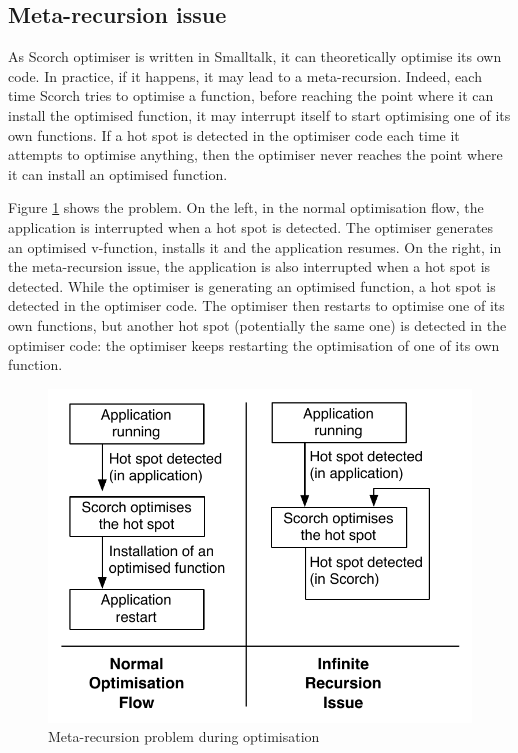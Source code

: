 \documentclass[a4paper,12pt,twoside]{../includes/ThesisStyle}
\begin{document}
\subsection{Meta-recursion issue}

As Scorch optimiser is written in Smalltalk, it can theoretically optimise its own code. In practice, if it happens, it may lead to a meta-recursion. Indeed, each time Scorch tries to optimise a function, before reaching the point where it can install the optimised function, it may interrupt itself to start optimising one of its own functions. If a hot spot is detected in the optimiser code each time it attempts to optimise anything, then the optimiser never reaches the point where it can install an optimised function.

Figure \ref{fig:InfiniteRecursionOptPb} shows the problem. On the left, in the normal optimisation flow, the application is interrupted when a hot spot is detected. The optimiser generates an optimised v-function, installs it and the application resumes. On the right, in the meta-recursion issue, the application is also interrupted when a hot spot is detected. While the optimiser is generating an optimised function, a hot spot is detected in the optimiser code. The optimiser then restarts to optimise one of its own functions, but another hot spot (potentially the same one) is detected in the optimiser code: the optimiser keeps restarting the optimisation of one of its own function.

\begin{figure}[h!]
    \begin{center}
        \includegraphics[width=0.65\linewidth]{InfiniteRecursionOptPb}
        \caption{Meta-recursion problem during optimisation}
        \label{fig:InfiniteRecursionOptPb}
    \end{center}
\end{figure}
\end{document}
